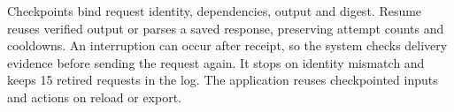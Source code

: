 Checkpoints bind request identity, dependencies, output and digest.
Resume reuses verified output or parses a saved response, preserving
attempt counts and cooldowns. An interruption can occur after receipt,
so the system checks delivery evidence before sending the request again.
It stops on identity mismatch and keeps 15 retired requests in the log.
The application reuses checkpointed inputs and actions on reload or export.
